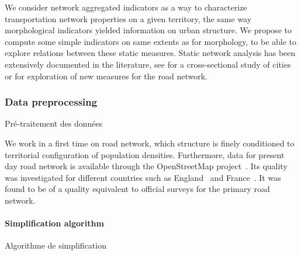 

We consider network aggregated indicators as a way to characterize transportation network properties on a given territory, the same way morphological indicators yielded information on urban structure. We propose to compute some simple indicators on same extents as for morphology, to be able to explore relations between these static measures. Static network analysis has been extensively documented in the literature, see \cite{louf2014typology} for a cross-sectional study of cities or \cite{2015arXiv151201268L} for exploration of new measures for the road network.


\subsubsection{Data preprocessing}{Pré-traitement des données}

We work in a first time on road network, which structure is finely conditioned to territorial configuration of population densities. Furthermore, data for present day road network is available through the OpenStreetMap project~\cite{openstreetmap}. Its quality was investigated for different countries such as England~\cite{haklay2010good} and France~\cite{girres2010quality}. It was found to be of a quality equivalent to official surveys for the primary road network.





\paragraph{Simplification algorithm}{Algorithme de simplification}

